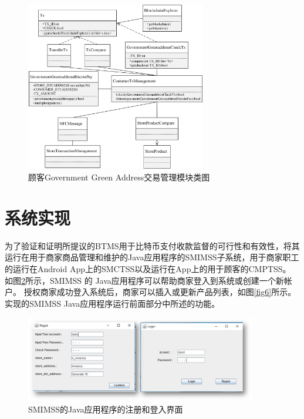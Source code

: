 	\begin{figure}[!htbp]
		\centering
		\includegraphics[width = 0.7\textwidth]{c6.jpg}
		\caption{顾客Government Green Address交易管理模块类图}\label{c6}
	\end{figure}

\section{系统实现}


为了验证和证明所提议的BTMS用于比特币支付收款监督的可行性和有效性，将其运行在用于商家商品管理和维护的Java应用程序的SMIMSS子系统，用于商家职工的运行在Android App上的SMCTSS以及运行在App上的用于顾客的CMPTSS。
如图\ref{fig5}所示，SMIMSS 的 Java应用程序可以帮助商家登入到系统或创建一个新帐户。 授权商家成功登入系统后，商家可以插入或更新产品列表，如图\ref{fig6}所示。实现的SMIMSS Java应用程序运行前面部分中所述的功能。

\begin{figure}[!htbp]
	\centering
	\includegraphics[width = 0.9\textwidth]{fig5.png}
	\caption{SMIMSS的Java应用程序的注册和登入界面}\label{fig5}
\end{figure}


